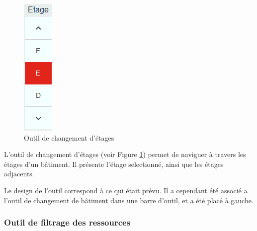 \documentclass[
    iai, %
    il, %
]{heig-tb}
\begin{document}
\begin{figure}[h]
    \centering
    \includegraphics[scale=0.8]{frontend-floorChange.png}
    \caption{Outil de changement d'étages}
    \label{fig:changement-étage}
\end{figure}

L'outil de changement d'étages (voir Figure \ref{fig:changement-étage}) permet de naviguer à travers les étages d'un bâtiment.
Il présente l'étage selectionné, ainsi que les étages adjacents.

Le design de l'outil correspond à ce qui était prévu. Il a cependant été associé a l'outil de changement de bâtiment dans une barre d'outil,
et a été placé à gauche.

\subsubsection{Outil de filtrage des ressources}
\end{document}
